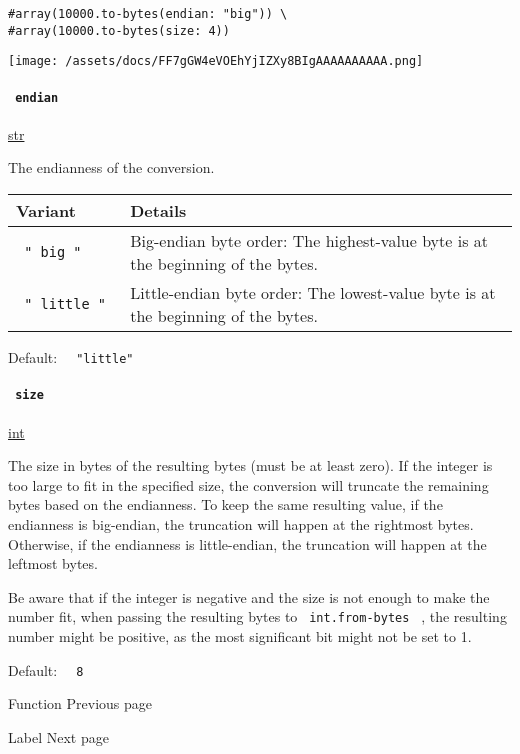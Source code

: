 \begin{verbatim}
#array(10000.to-bytes(endian: "big")) \
#array(10000.to-bytes(size: 4))
\end{verbatim}

\texttt{[image: /assets/docs/FF7gGW4eVOEhYjIZXy8BIgAAAAAAAAAA.png]}

\paragraph{\texorpdfstring{\texttt{\ endian\ }}{ endian }}\label{definitions-to-bytes-endian}

\href{/docs/reference/foundations/str/}{str}

The endianness of the conversion.

\begin{longtable}[]{@{}ll@{}}
\toprule\noalign{}
Variant & Details \\
\midrule\noalign{}
\endhead
\bottomrule\noalign{}
\endlastfoot
\texttt{\ "\ big\ "\ } & Big-endian byte order: The highest-value byte
is at the beginning of the bytes. \\
\texttt{\ "\ little\ "\ } & Little-endian byte order: The lowest-value
byte is at the beginning of the bytes. \\
\end{longtable}

Default: \texttt{\ }{\texttt{\ "little"\ }}\texttt{\ }

\paragraph{\texorpdfstring{\texttt{\ size\ }}{ size }}\label{definitions-to-bytes-size}

\href{/docs/reference/foundations/int/}{int}

The size in bytes of the resulting bytes (must be at least zero). If the
integer is too large to fit in the specified size, the conversion will
truncate the remaining bytes based on the endianness. To keep the same
resulting value, if the endianness is big-endian, the truncation will
happen at the rightmost bytes. Otherwise, if the endianness is
little-endian, the truncation will happen at the leftmost bytes.

Be aware that if the integer is negative and the size is not enough to
make the number fit, when passing the resulting bytes to
\texttt{\ int.from-bytes\ } , the resulting number might be positive, as
the most significant bit might not be set to 1.

Default: \texttt{\ }{\texttt{\ 8\ }}\texttt{\ }

\href{/docs/reference/foundations/function/}{\pandocbounded{}}

{ Function } { Previous page }

\href{/docs/reference/foundations/label/}{\pandocbounded{}}

{ Label } { Next page }
